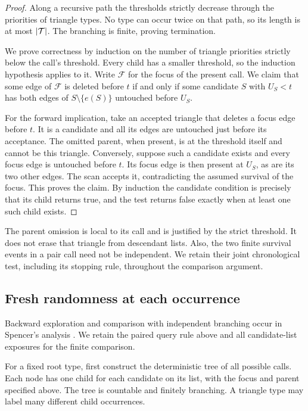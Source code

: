 \begin{proof}
Along a recursive path the thresholds strictly decrease through the
priorities of triangle types.  No type can occur twice on that path,
so its length is at most $|\mathcal T|$.  The branching is finite, proving
termination.

We prove correctness by induction on the number of triangle priorities
strictly below the call's threshold.  Every child has a smaller
threshold, so the induction hypothesis applies to it.  Write $\mathcal F$
for the focus of the present call.  We claim that some edge of
$\mathcal F$ is deleted before $t$ if and only if some candidate $S$
with $U_S<t$ has both edges of $S\setminus\{e(S)\}$ untouched before
$U_S$.

For the forward implication, take an accepted triangle that deletes a
focus edge before $t$.  It is a candidate and all its edges are
untouched just before its acceptance.  The omitted parent, when
present, is at the threshold itself and cannot be this triangle.
Conversely, suppose such a candidate exists and every focus edge is
untouched before $t$.  Its focus edge is then present at $U_S$, as are
its two other edges.  The scan accepts it, contradicting the assumed
survival of the focus.  This proves the claim.  By induction the
candidate condition is precisely that its child returns true, and the
test returns false exactly when at least one such child exists.
\end{proof}

The parent omission is local to its call and is justified by the strict
threshold.  It does not erase that triangle from descendant lists.
Also, the two finite survival events in a pair call need not be
independent.  We retain their joint chronological test, including its
stopping rule, throughout the comparison argument.

\subsection{Fresh randomness at each occurrence}

Backward exploration and comparison with independent branching occur in
Spencer's analysis \cite[Sections~2--4]{Spencer1995}. We retain the paired
query rule above and all candidate-list exposures for the finite comparison.

For a fixed root type, first construct the deterministic tree of all
possible calls.  Each node has one child for each candidate on its
list, with the focus and parent specified above.  The tree is countable
and finitely branching.  A triangle type may label many different
child occurrences.

